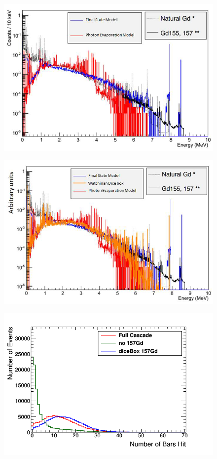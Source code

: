 \begin{figure}[htbp]
 \centering
 \includegraphics[width=0.7\linewidth]{Chapter4/Figs/Raster/gadolinium/comparisonGd.png}
 \label{fig:comparisonGd}
\end{figure}

\begin{figure}[htbp]
 \centering
 \includegraphics[width=0.7\linewidth]{Chapter4/Figs/Raster/gadolinium/comparisonAndDiceBoxGd.png}
 \label{fig:comparisonAndDiceBoxGd}
\end{figure}
 
\begin{figure}[htbp]
 \centering
 \includegraphics[width=0.7\linewidth]{Chapter4/Figs/Raster/gadolinium/numberOfBarsHitCascadeFinalStateDicebox.png}
 \label{fig:numberOfBarsHitCascadeFinalStateDicebox}
\end{figure}


